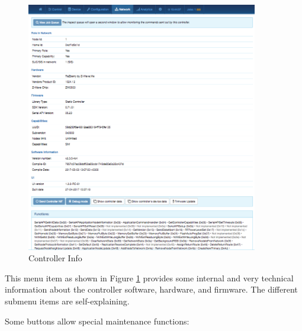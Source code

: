 \begin{figure}
\begin{center}
\includegraphics[width=0.9\textwidth]{pngs/cap7/eui27.png}
\caption{Controller Info}
\label{eui27}
\end{center}
\end{figure}

This menu item as shown in Figure \ref{eui27} provides some internal and very technical 
information about the \zway controller software, hardware, and firmware. The different 
submenu items are self-explaining.

Some buttons allow special maintenance functions:

